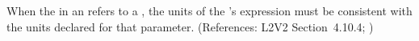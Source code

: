 When the  in an \InitialAssignment refers to a \Parameter,
the units of the \InitialAssignment's  expression must be
consistent with the units declared for that parameter.  (References: L2V2
Section~4.10.4; )
